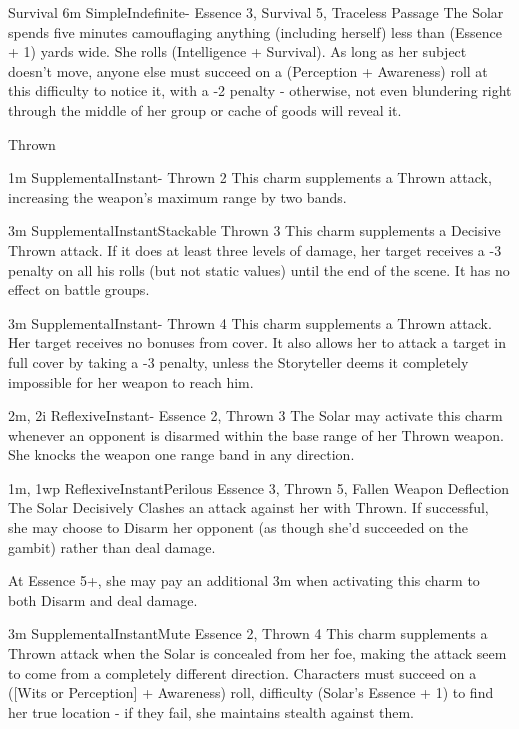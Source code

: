 \begin{Ability}{Survival}
  {6m}
  {Simple}{Indefinite}{-}
  {Essence 3, Survival 5, Traceless Passage}
  The Solar spends five minutes camouflaging anything (including herself) less than (Essence + 1) yards wide. She rolls (Intelligence + Survival). As long as her subject doesn't move, anyone else must succeed on a (Perception + Awareness) roll at this difficulty to notice it, with a -2 penalty - otherwise, not even blundering right through the middle of her group or cache of goods will reveal it.

  \end{Ability}

\begin{Ability}{Thrown}

  {1m}
  {Supplemental}{Instant}{-}
  {Thrown 2}
  This charm supplements a Thrown attack, increasing the weapon's maximum range by two bands.

  {3m}
  {Supplemental}{Instant}{Stackable}
  {Thrown 3}
  This charm supplements a Decisive Thrown attack. If it does at least three levels of damage, her target receives a -3 penalty on all his rolls (but not static values) until the end of the scene. It has no effect on battle groups.

  {3m}
  {Supplemental}{Instant}{-}
  {Thrown 4}
  This charm supplements a Thrown attack. Her target receives no bonuses from cover. It also allows her to attack a target in full cover by taking a -3 penalty, unless the Storyteller deems it completely impossible for her weapon to reach him.

  {2m, 2i}
  {Reflexive}{Instant}{-}
  {Essence 2, Thrown 3}
  The Solar may activate this charm whenever an opponent is disarmed within the base range of her Thrown weapon. She knocks the weapon one range band in any direction.

  {1m, 1wp}
  {Reflexive}{Instant}{Perilous}
  {Essence 3, Thrown 5, Fallen Weapon Deflection}
  The Solar Decisively Clashes an attack against her with Thrown. If successful, she may choose to Disarm her opponent (as though she'd succeeded on the gambit) rather than deal damage.

  At Essence 5+, she may pay an additional 3m when activating this charm to both Disarm and deal damage.

  {3m}
  {Supplemental}{Instant}{Mute}
  {Essence 2, Thrown 4}
  This charm supplements a Thrown attack when the Solar is concealed from her foe, making the attack seem to come from a completely different direction. Characters must succeed on a ([Wits or Perception] + Awareness) roll, difficulty (Solar's Essence + 1) to find her true location - if they fail, she maintains stealth against them.


\end{Ability}
